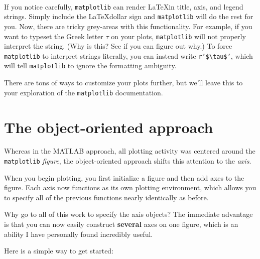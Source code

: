 \documentclass{article}
\begin{document}
    \begin{center}
    \end{center}
    { \hspace*{\fill} \\}
    
    If you notice carefully, \texttt{matplotlib} can render \LaTeX in
title, axis, and legend strings. Simply include the \LaTeX dollar sign
and \texttt{matplotlib} will do the rest for you. Now, there are tricky
grey-areas with this functionality. For example, if you want to typeset
the Greek letter $\tau$ on your plots, \texttt{matplotlib} will not
properly interpret the string. (Why is this? See if you can figure out
why.) To force \texttt{matplotlib} to interpret strings literally, you
can instead write \texttt{r'\$\textbackslash{}tau\$'}, which will tell
\texttt{matplotlib} to ignore the formatting ambiguity.

There are tons of ways to customize your plots further, but we'll leave
this to your exploration of the \texttt{matplotlib} documentation.

    \section{The object-oriented
approach}\label{the-object-oriented-approach}

    Whereas in the MATLAB approach, all plotting activity was centered
around the \texttt{matplotlib} \emph{figure}, the object-oriented
approach shifts this attention to the \emph{axis}.

When you begin plotting, you first initialize a figure and then add axes
to the figure. Each axis now functions as its own plotting environment,
which allows you to specify all of the previous functions nearly
identically as before.

Why go to all of this work to specify the axis objects? The immediate
advantage is that you can now easily construct \textbf{several} axes on
one figure, which is an ability I have personally found incredibly
useful.

Here is a simple way to get started:
\end{document}
